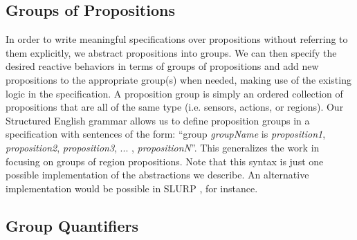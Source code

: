 \subsection{Groups of Propositions} 

In order to write meaningful specifications over propositions without referring to them explicitly, we abstract propositions into groups. We can then specify the desired reactive behaviors in terms of groups of propositions and add new propositions to the appropriate group(s) when needed, making use of the existing logic in the specification. A proposition group is simply an ordered collection of propositions that are all of the same type (i.e. sensors, actions, or regions). Our Structured English grammar allows us to define proposition groups in a specification with sentences of the form: ``group \textit{groupName} is \textit{proposition1}, \textit{proposition2}, \textit{proposition3}, ... , \textit{propositionN}''. This generalizes the work in \cite{BingxinRSS2012} focusing on groups of region propositions. Note that this syntax is just one possible implementation of the abstractions we describe. An alternative implementation would be possible in SLURP \cite{RamanRSS2013}, for instance. 

\subsection{Group Quantifiers} 

